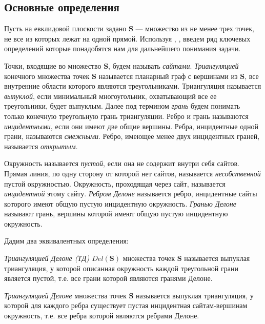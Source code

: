 \documentclass[12pt]{article}
\begin{document}
\subsection{Основные определения}
Пусть на евклидовой плоскости задано $\textbf{S}$ --- множество из не менее трех точек, не все из которых лежат на одной прямой.
Используя \cite[стр.~7-8]{Skvortsov}, \cite{MestOverlap}, введем ряд ключевых определений которые понадобятся нам для дальнейшего понимания задачи.

Точки, входящие во множество $\textbf{S}$, будем называть {\itshape сайтами}.
{\itshape Триангуляцией} конечного множества точек $\textbf{S}$ называется планарный граф с вершинами из $\textbf{S}$,
все внутренние области которого являются треугольниками.
Триангуляция называется {\itshape выпуклой}, если минимальный многоугольник, охватывающий все ее треугольники, будет выпуклым.
Далее под термином {\itshape грань} будем понимать только конечную треугольную грань триангуляции.
Ребро и грань называются {\itshape инцидентными}, если они имеют две общие вершины.
Ребра, инцидентные одной грани, называются {\itshape смежными}.
Ребро, имеющее менее двух инцидентных граней, называется {\itshape открытым}.

Окружность называется {\itshape пустой}, если она не содержит внутри себя сайтов.
Прямая линия, по одну сторону от которой нет сайтов, называется {\itshape несобственной} пустой окружностью.
Окружность, проходящая через сайт, называется {\itshape инцидентной} этому сайту.
{\itshape Ребром Делоне} называется ребро, инцидентные сайты которого имеют общую пустую инцидентную окружность.
{\itshape Гранью Делоне} называют грань, вершины которой имеют общую пустую инцидентную окружность.

Дадим два эквивалентных определения:

\begin{definition}
{\itshape Триангуляцией Делоне (ТД) $Del(\textbf{S})$} множества точек $\textbf{S}$ называется выпуклая триангуляция,
у которой описанная окружность каждой треугольной грани является пустой,
т.е. все грани которой являются гранями Делоне.
\end{definition}

\begin{definition}
{\itshape Триангуляцией Делоне} множества точек $\textbf{S}$ называется выпуклая триангуляция,
у которой для каждого ребра существует пустая инцидентная сайтам-вершинам окружность,
т.е. все ребра которой являются ребрами Делоне.
\end{definition}
\end{document}

